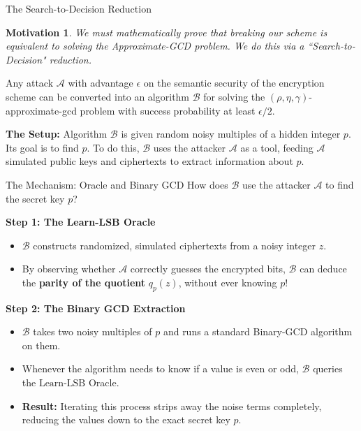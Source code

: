 \documentclass[10pt,handout]{beamer}
\newtheorem{motivation}{Motivation}
\begin{document}
\begin{frame}{The Search-to-Decision Reduction}
    \begin{motivation}
    We must mathematically prove that breaking our scheme is equivalent to solving the Approximate-GCD problem. We do this via a ``Search-to-Decision" reduction.
    \end{motivation}
    \pause
    
    \vspace{0.3cm}
    \begin{theorem}
    Any attack $\mathcal{A}$ with advantage $\epsilon$ on the semantic security of the encryption scheme can be converted into an algorithm $\mathcal{B}$ for solving the $(\rho, \eta, \gamma)$-approximate-gcd problem with success probability at least $\epsilon/2$.
    \end{theorem}
    \pause
    
    \vspace{0.3cm}
    \textbf{The Setup:} 
    Algorithm $\mathcal{B}$ is given random noisy multiples of a hidden integer $p$. Its goal is to find $p$. To do this, $\mathcal{B}$ uses the attacker $\mathcal{A}$ as a tool, feeding $\mathcal{A}$ simulated public keys and ciphertexts to extract information about $p$.
\end{frame}

\begin{frame}{The Mechanism: Oracle and Binary GCD}
    How does $\mathcal{B}$ use the attacker $\mathcal{A}$ to find the secret key $p$?
    \pause

    \vspace{0.3cm}
    \textbf{Step 1: The Learn-LSB Oracle}
    \begin{itemize}
        \item $\mathcal{B}$ constructs randomized, simulated ciphertexts from a noisy integer $z$.
        \item By observing whether $\mathcal{A}$ correctly guesses the encrypted bits, $\mathcal{B}$ can deduce the \textbf{parity of the quotient} $q_p(z)$, without ever knowing $p$!
    \end{itemize}
    \pause

    \vspace{0.3cm}
    \textbf{Step 2: The Binary GCD Extraction}
    \begin{itemize}
        \item $\mathcal{B}$ takes two noisy multiples of $p$ and runs a standard Binary-GCD algorithm on them.
        \item Whenever the algorithm needs to know if a value is even or odd, $\mathcal{B}$ queries the $\text{Learn-LSB}$ Oracle.
        \item \textbf{Result:} Iterating this process strips away the noise terms completely, reducing the values down to the exact secret key $p$.
    \end{itemize}
\end{frame}
\end{document}
